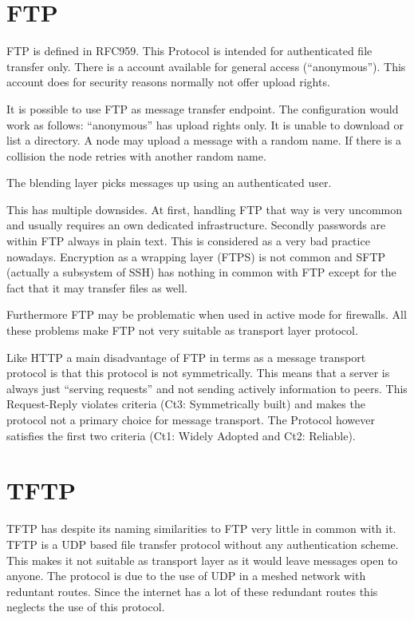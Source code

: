 \documentclass[a4paper,appendixprefix,pdfusetitle,twocolumn,draft,8pt]{scrbook}
\begin{document}
\section{FTP}
FTP is defined in RFC959\cite{RFC959}. This Protocol is intended for authenticated file transfer only. There is a account available for general access (``anonymous''). This account does for security reasons normally not offer upload rights.

It is possible to use FTP as message transfer endpoint. The configuration would work as follows: ``anonymous'' has upload rights only. It is unable to download or list a directory. A node may upload a message with a random name. If there is a collision the node retries with another random name.

The blending layer picks messages up using an authenticated user.

This has multiple downsides. At first, handling FTP that way is very uncommon and usually requires an own dedicated infrastructure. Secondly passwords are within FTP always in plain text. This is considered as a very bad practice nowadays. Encryption as a wrapping layer (FTPS) is not common and SFTP (actually a subsystem of SSH) has nothing in common with FTP except for the fact that it may transfer files as well.

Furthermore FTP may be problematic when used in active mode for firewalls. All these problems make FTP not very suitable as transport layer protocol.

Like HTTP a main disadvantage of FTP in terms as a message transport protocol is that this protocol is not symmetrically. This means that a server is always just ``serving requests'' and not sending actively information to peers. This Request-Reply violates criteria (Ct3: Symmetrically built) and makes the protocol not a primary choice for  message transport. The Protocol however satisfies the first two criteria  (Ct1: Widely Adopted and Ct2: Reliable).

\section{TFTP}
TFTP has despite its naming similarities to FTP very little in common with it. TFTP is a UDP based file transfer protocol without any authentication scheme. This makes it not suitable as transport layer as it would leave messages open to anyone. The protocol is due to the use of UDP in a meshed network with reduntant routes. Since the internet has a lot of these redundant routes this neglects the use of this protocol.
\end{document}
